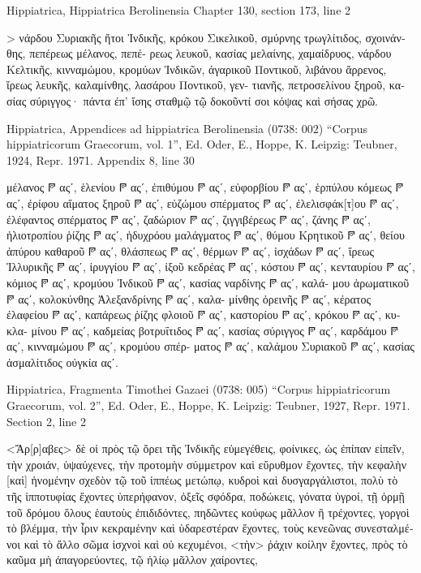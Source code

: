 \documentclass[12pt,letterpaper,twoside,final]{memoir}
\begin{document}
\begin{greek}
Hippiatrica, Hippiatrica Berolinensia 
Chapter 130, section 173, line 2

        > νάρδου Συριακῆς ἤτοι Ἰνδικῆς, κρόκου Σικελικοῦ, 
σμύρνης τρωγλίτιδος, σχοινάνθης, πεπέρεως μέλανος, πεπέ-  
ρεως λευκοῦ, κασίας μελαίνης, χαμαίδρυος, νάρδου Κελτικῆς, 
κινναμώμου, κρομύων Ἰνδικῶν, ἀγαρικοῦ Ποντικοῦ, λιβάνου 
ἄρρενος, ἴρεως λευκῆς, καλαμίνθης, λασάρου Ποντικοῦ, γεν-
τιανῆς, πετροσελίνου ξηροῦ, κασίας σύριγγος· πάντα ἐπ' ἴσης 
σταθμῷ τῷ δοκοῦντί σοι κόψας καὶ σήσας χρῶ. 



Hippiatrica, Appendices ad hippiatrica Berolinensia (0738: 002)
“Corpus hippiatricorum Graecorum, vol. 1”, Ed. Oder, E., Hoppe, K.
Leipzig: Teubner, 1924, Repr. 1971.
Appendix 8, line 30

μέλανος 𐆄 αςʹ, ἑλενίου 𐆄 αςʹ, ἐπιθύμου 𐆄 αςʹ, εὐφορβίου 𐆄 αςʹ, 
ἑρπύλου κόμεως 𐆄 αςʹ, ἐρίφου αἵματος ξηροῦ 𐆄 αςʹ, εὐζώμου 
σπέρματος 𐆄 αςʹ, ἐλελισφάκ[τ]ου 𐆄 αςʹ, ἐλέφαντος σπέρματος 𐆄 αςʹ, 
ζαδώριον 𐆄 αςʹ, ζιγγιβέρεως 𐆄 αςʹ, ζάνης 𐆄 αςʹ, ἡλιοτροπίου 
ῥίζης 𐆄 αςʹ, ἡδυχρόου μαλάγματος 𐆄 αςʹ, θύμου Κρητικοῦ 
𐆄 αςʹ, θείου ἀπύρου καθαροῦ 𐆄 αςʹ, θλάσπεως 𐆄 αςʹ, θέρμων 
𐆄 αςʹ, ἰσχάδων 𐆄 αςʹ, ἴρεως Ἰλλυρικῆς 𐆄 αςʹ, ἰρυγγίου 𐆄 αςʹ, 
ἰξοῦ κεδρέας 𐆄 αςʹ, κόστου 𐆄 αςʹ, κενταυρίου 𐆄 αςʹ, κόμιος 
𐆄 αςʹ, κρομύου Ἰνδικοῦ 𐆄 αςʹ, κασίας ναρδίνης 𐆄 αςʹ, καλά-
μου ἀρωματικοῦ 𐆄 αςʹ, κολοκύνθης Ἀλεξανδρίνης 𐆄 αςʹ, καλα-
μίνθης ὀρεινῆς 𐆄 αςʹ, κέρατος ἐλαφείου 𐆄 αςʹ, καπάρεως 
ῥίζης φλοιοῦ 𐆄 αςʹ, καστορίου 𐆄 αςʹ, κρόκου 𐆄 αςʹ, κυκλα-
μίνου 𐆄 αςʹ, καδμείας βοτρυΐτιδος 𐆄 αςʹ, κασίας σύριγγος 
𐆄 αςʹ, καρδάμου 𐆄 αςʹ, κινναμώμου 𐆄 αςʹ, κρομύου σπέρ-
ματος 𐆄 αςʹ, καλάμου Συριακοῦ 𐆄 αςʹ, κασίας ἀσμαλίτιδος 
οὐγκία αςʹ. 



Hippiatrica, Fragmenta Timothei Gazaei (0738: 005)
“Corpus hippiatricorum Graecorum, vol. 2”, Ed. Oder, E., Hoppe, K.
Leipzig: Teubner, 1927, Repr. 1971.
Section 2, line 2

   <Ἄρ[ρ]αβες> δὲ οἱ πρὸς τῷ ὄρει τῆς 
Ἰνδικῆς εὐμεγέθεις, φοίνικες, ὡς ἐπίπαν εἰπεῖν, τὴν χροιάν, 
ὑψαύχενες, τὴν προτομὴν σύμμετρον καὶ εὔρυθμον ἔχοντες, 
τὴν κεφαλὴν [καὶ] ἡνομένην σχεδὸν τῷ τοῦ ἱππέως μετώπῳ, 
κυδροὶ καὶ δυσγαργάλιστοι, πολὺ τὸ τῆς ἱπποτυφίας ἔχοντες 
ὑπερήφανον, ὀξεῖς σφόδρα, ποδώκεις, γόνατα ὑγροί, τῇ ὁρμῇ 
τοῦ δρόμου ὅλους ἑαυτοὺς ἐπιδιδόντες, πηδῶντες κούφως 
μᾶλλον ἢ τρέχοντες, γοργοὶ τὸ βλέμμα, τὴν ἶριν κεκραμένην 
καὶ ὑδαρεστέραν ἔχοντες, τοὺς κενεῶνας συνεσταλμένοι καὶ τὸ 
ἄλλο σῶμα ἰσχνοὶ καὶ οὐ κεχυμένοι, <τὴν> ῥάχιν κοίλην ἔχοντες, 
πρὸς τὸ καῦμα μὴ ἀπαγορεύοντες, τῷ ἡλίῳ μᾶλλον χαίροντες, 





\end{greek}
\end{document}
